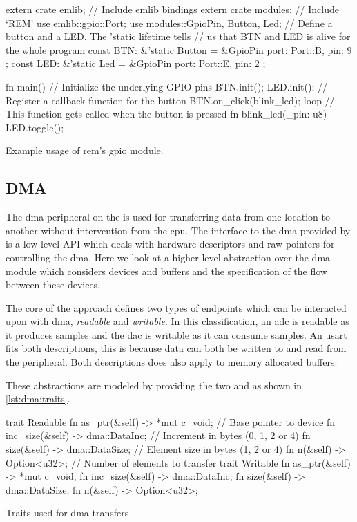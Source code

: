 \begin{listing}[H]
  \begin{rustcode}
extern crate emlib;         // Include emlib bindings
extern crate modules;       // Include `REM'
use emlib::gpio::Port;
use modules::{GpioPin, Button, Led};
// Define a button and a LED. The 'static lifetime tells
// us that BTN and LED is alive for the whole program
const BTN: &'static Button = &GpioPin { port: Port::B, pin: 9 };
const LED: &'static Led    = &GpioPin { port: Port::E, pin: 2 };

fn main() {
    // Initialize the underlying GPIO pins
    BTN.init();
    LED.init();
    // Register a callback function for the button
    BTN.on_click(blink_led);
    loop {}
}
// This function gets called when the button is pressed
fn blink_led(_pin: u8) {
    LED.toggle();
}
  \end{rustcode}
  \caption{Example usage of \gls{rem}'s \gls{gpio} module.}
  \label{lst:gpio_abstraction}
\end{listing}

\subsection{DMA}

The \gls{dma} peripheral on the {\gecko} is used for transferring data from one location to another without intervention from the \gls{cpu}.
The interface to the \gls{dma} provided by {\emlib} is a low level API which deals with hardware descriptors and raw pointers for controlling the \gls{dma}.
Here we look at a higher level abstraction over the \gls{dma} module which considers devices and buffers and the specification of the flow between these devices.

The core of the approach defines two types of endpoints which can be interacted upon with \gls{dma}, \emph{readable} and \emph{writable}.
In this classification, an \gls{adc} is readable as it produces samples and the \gls{dac} is writable as it can consume samples.
An \gls{usart} fits both descriptions, this is because data can both be written to and read from the peripheral.
Both descriptions does also apply to memory allocated buffers.

These abstractions are modeled by providing the two   and  as shown in \autoref{lst:dma:traits}.

\begin{listing}[H]
  \begin{rustcode}
trait Readable {
  fn as_ptr(&self) -> *mut c_void;     // Base pointer to device
  fn inc_size(&self) -> dma::DataInc;  // Increment in bytes (0, 1, 2 or 4)
  fn size(&self) -> dma::DataSize;     // Element size in bytes (1, 2 or 4)
  fn n(&self) -> Option<u32>;          // Number of elements to transfer
}
trait Writable {
  fn as_ptr(&self) -> *mut c_void;
  fn inc_size(&self) -> dma::DataInc;
  fn size(&self) -> dma::DataSize;
  fn n(&self) -> Option<u32>;
}
  \end{rustcode}
  \caption{Traits used for \gls{dma} transfers}
  \label{lst:dma:traits}
\end{listing}

